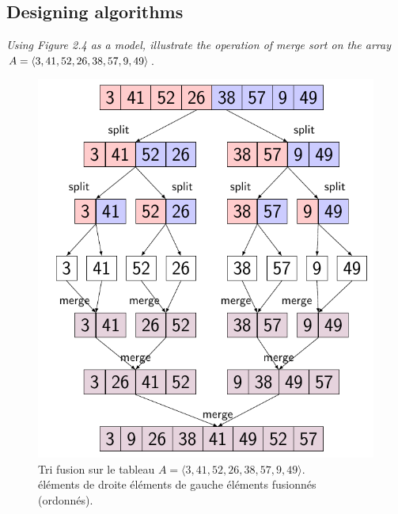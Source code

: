 \subsection{Designing algorithms}

\begin{description}
   {\itshape Using Figure 2.4 as a model, illustrate the operation of merge sort on the array $A =\\ \langle 3, 41, 52, 26, 38, 57, 9, 49\rangle$}.

    \begin{ex}
      \begin{figure}[H]
        \centering
          \includegraphics[scale=1]{img/2_3-1/2_3-1.pdf}
        \caption{Tri fusion sur le tableau $A =\langle 3, 41, 52, 26, 38, 57, 9, 49\rangle$.\\
           éléments de droite
           éléments de gauche
           éléments fusionnés (ordonnés).}
      \end{figure}
      

\end{ex}
\end{description}
